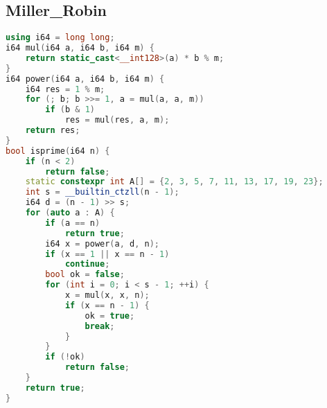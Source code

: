 \subsection{Miller\_Robin}
\begin{lstlisting}[language=C++]
using i64 = long long;
i64 mul(i64 a, i64 b, i64 m) {
    return static_cast<__int128>(a) * b % m;
}
i64 power(i64 a, i64 b, i64 m) {
    i64 res = 1 % m;
    for (; b; b >>= 1, a = mul(a, a, m))
        if (b & 1)
            res = mul(res, a, m);
    return res;
}
bool isprime(i64 n) {
    if (n < 2)
        return false;
    static constexpr int A[] = {2, 3, 5, 7, 11, 13, 17, 19, 23};
    int s = __builtin_ctzll(n - 1);
    i64 d = (n - 1) >> s;
    for (auto a : A) {
        if (a == n)
            return true;
        i64 x = power(a, d, n);
        if (x == 1 || x == n - 1)
            continue;
        bool ok = false;
        for (int i = 0; i < s - 1; ++i) {
            x = mul(x, x, n);
            if (x == n - 1) {
                ok = true;
                break;
            }
        }
        if (!ok)
            return false;
    }
    return true;
}
\end{lstlisting}
